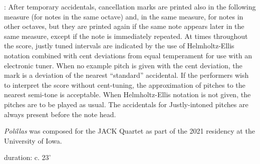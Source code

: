 \documentclass[11pt]{article}
\begin{document}
\begin{center}
 : After temporary accidentals, cancellation marks are printed also in the following measure (for notes in the same octave) and, in the same measure, for notes in other octaves, but they are printed again if the same note appears later in the same measure, except if the note is immediately repeated. At times throughout the score, justly tuned intervals are indicated by the use of Helmholtz-Ellis notation combined with cent deviations from equal temperament for use with an electronic tuner. When no example pitch is given with the cent deviation, the mark is a deviation of the nearest ``standard'' accidental. If the performers wish to interpret the score without cent-tuning, the approximation of pitches to the nearest semi-tone is acceptable. When Helmholtz-Ellis notation is not given, the pitches are to be played as usual. The accidentals for Justly-intoned pitches are always present before the note head.
\rightskip\leftskip
\phantom{text} \hfill \phantom{()}
\end{center}
\endgroup

\vspace*{9\baselineskip}

\begin{center}
\textit{Polillas} was composed for the JACK Quartet as part of the 2021 residency at the University of Iowa.
\rightskip\leftskip
\phantom{text} \hfill \phantom{()}
\end{center}

\vspace*{26\baselineskip}

\begin{center}
duration: c. 23'
\end{center}
\end{document}

